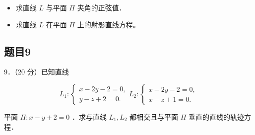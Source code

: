 \documentclass{article}
\begin{document}
\begin{itemize}
  \item[（1）] 求直线 \(L\) 与平面 \(\Pi\) 夹角的正弦值．
  \item[（2）] 求直线 \(L\) 在平面 \(\Pi\) 上的射影直线方程。
\end{itemize}

\subsection{题目9}
9．（20 分）已知直线

\[
L_{1}:\left\{\begin{array}{l}
x-2 y-2=0, \\
y-z+2=0 .
\end{array} L_{2}:\left\{\begin{array}{l}
x-2 y-2=0, \\
x-z+1=0 .
\end{array}\right.\right.
\]

平面 \(\Pi: x-y+2=0\) ．求与直线 \(L_{1}, L_{2}\) 都相交且与平面 \(\Pi\) 垂直的直线的轨迹方程．
\end{document}
